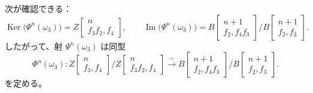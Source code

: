 \clearpage
{}%
\begingroup\small\setlength{\parskip}{0pt}\setlength{\emergencystretch}{2em}
次が確認できる：
\[
\operatorname{Ker}\bigl(\Psi^n(\omega_3)\bigr)
=Z\!\begin{bmatrix}n\\ f_3f_2,f_4\end{bmatrix},
\qquad
\operatorname{Im}\bigl(\Psi^n(\omega_3)\bigr)
=B\!\begin{bmatrix}n+1\\ f_2,f_4f_3\end{bmatrix}
 \Big/
 B\!\begin{bmatrix}n+1\\ f_2,f_3\end{bmatrix}.
\]
したがって、射 $\Psi^n(\omega_3)$ は同型
\[
\Phi^n(\omega_3)\colon
Z\!\begin{bmatrix}n\\ f_3,f_4\end{bmatrix}
 \Big/
Z\!\begin{bmatrix}n\\ f_3f_2,f_4\end{bmatrix}
\xrightarrow{\ \sim\ }
B\!\begin{bmatrix}n+1\\ f_2,f_4f_3\end{bmatrix}
 \Big/
B\!\begin{bmatrix}n+1\\ f_2,f_3\end{bmatrix}.
\]
を定める。

